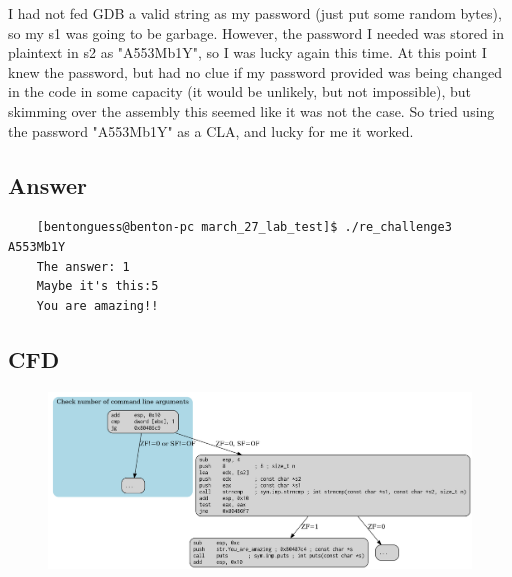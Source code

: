 \documentclass[11pt]{article}
\begin{document}
I had not fed GDB a valid string as my password (just put some random bytes), so my s1 was going to be garbage. However, the password I needed was stored in plaintext in s2 as "A553Mb1Y", so I was lucky again this time. At this point I knew the password, but had no clue if my password provided was being changed in the code in some capacity (it would be unlikely, but not impossible), but skimming over the assembly this seemed like it was not the case. So tried using the password "A553Mb1Y" as a CLA, and lucky for me it worked.

\subsection*{Answer}
\begin{lstlisting}
    [bentonguess@benton-pc march_27_lab_test]$ ./re_challenge3 A553Mb1Y
    The answer: 1
    Maybe it's this:5
    You are amazing!!
\end{lstlisting}

\subsection*{CFD}
\begin{figure}[H]
    \centering
    \includegraphics[width=0.99\linewidth]{./graphviz/challenge3.png}
\end{figure}
\end{document}
